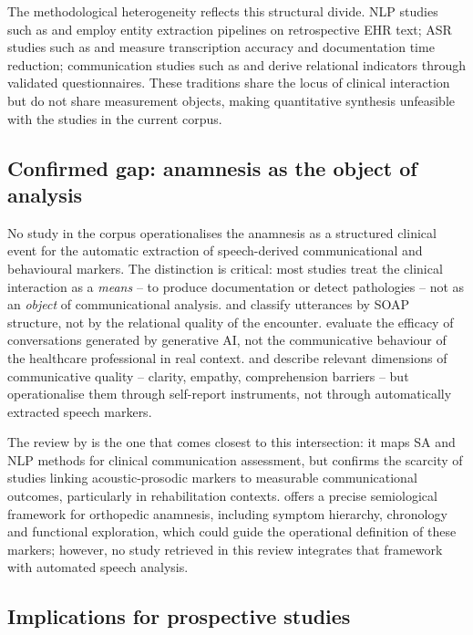 \documentclass[review,12pt]{elsarticle}
\begin{document}
The methodological heterogeneity reflects this structural divide.
NLP studies such as \citet{Bazoge2023} and
\citet{Wang2018} employ entity extraction pipelines on retrospective
EHR text; ASR studies such as \citet{vanBuchem2021} and
\citet{Klusty2025} measure transcription accuracy and documentation time
reduction; communication studies such as \citet{Shao2025} and
\citet{Kelley2014} derive relational indicators through validated
questionnaires. These traditions share the locus of clinical interaction
but do not share measurement objects, making quantitative synthesis
unfeasible with the studies in the current corpus.

\subsection*{Confirmed gap: anamnesis as the object of analysis}

No study in the corpus operationalises the anamnesis as a structured clinical
event for the automatic extraction of speech-derived communicational and
behavioural markers.
The distinction is critical: most studies treat the clinical interaction as a
\emph{means} -- to produce documentation or detect pathologies -- not as an
\emph{object} of communicational analysis.
\citet{Krishna2021} and
\citet{Schloss2020} classify utterances by SOAP structure, not by the
relational quality of the encounter.
\citet{Abbasian2024} evaluate the efficacy of conversations generated by
generative AI, not the communicative behaviour of the healthcare professional
in real context.
\citet{Shao2025} and \citet{McCabe2018} describe relevant dimensions of
communicative quality -- clarity, empathy, comprehension barriers -- but
operationalise them through self-report instruments, not through automatically
extracted speech markers.

The review by \citet{Albert2024} is the one that comes closest to this
intersection: it maps SA and NLP methods for clinical communication assessment,
but confirms the scarcity of studies linking acoustic-prosodic markers to
measurable communicational outcomes, particularly in rehabilitation contexts.
\citet{Porto2019} offers a precise semiological framework for orthopedic
anamnesis, including symptom hierarchy, chronology and functional exploration,
which could guide the operational definition of these markers; however, no
study retrieved in this review integrates that framework with automated
speech analysis.

\subsection*{Implications for prospective studies}
\end{document}
